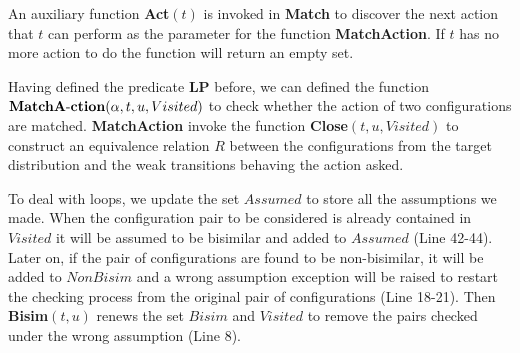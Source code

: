 \documentclass[runningheads]{llncs}
\begin{document}
An auxiliary function \textbf{Act}$(t)$ is invoked in \textbf{Match} to discover the next action that $t$ can perform as the parameter for the function \textbf{MatchAction}. If $t$ has no more action to do the function will return an empty set.

Having defined the predicate \textbf{LP} before, we can defined the function $\textbf{MatchA}\\\text{-}\textbf{ction}(\alpha, t, u, Visited)$ to check whether the action of two configurations are matched. \textbf{MatchAction} invoke the function \textbf{Close}$(t,u,Visited)$ to construct an equivalence relation $R$ between the configurations from the target distribution and the weak transitions behaving the action asked.

To deal with loops, we update the set $Assumed$ to store all the assumptions we made. When the configuration pair to be considered is already contained in $Visited$ it will be assumed to be bisimilar and added to $Assumed$ (Line 42-44). Later on, if the pair of configurations are found to be non-bisimilar, it will be added to $NonBisim$ and a wrong assumption exception will be raised to restart the checking process from the original pair of configurations (Line 18-21). Then \textbf{Bisim}$(t, u)$ renews the set $Bisim$ and $Visited$ to remove the pairs checked under the wrong assumption (Line 8).
\end{document}

